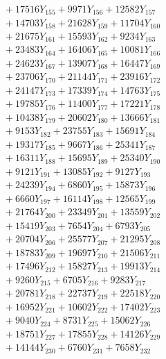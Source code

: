 \documentclass[a4paper,10pt]{article}
\begin{document}
{\begin{align}
&\;  + 17516 Y_{155} + 9971 Y_{156} + 12582 Y_{157} \\[0.3ex]
&\;  + 14703 Y_{158} + 21628 Y_{159} + 11704 Y_{160} \\[0.3ex]
&\;  + 21675 Y_{161} + 15593 Y_{162} + 9234 Y_{163} \\[0.3ex]
&\;  + 23483 Y_{164} + 16406 Y_{165} + 10081 Y_{166} \\[0.3ex]
&\;  + 24623 Y_{167} + 13907 Y_{168} + 16447 Y_{169} \\[0.3ex]
&\;  + 23706 Y_{170} + 21144 Y_{171} + 23916 Y_{172} \\[0.3ex]
&\;  + 24147 Y_{173} + 17339 Y_{174} + 14763 Y_{175} \\[0.3ex]
&\;  + 19785 Y_{176} + 11400 Y_{177} + 17221 Y_{178} \\[0.5ex]\allowbreak
&\;  + 10438 Y_{179} + 20602 Y_{180} + 13666 Y_{181} \\[0.3ex]
&\;  + 9153 Y_{182} + 23755 Y_{183} + 15691 Y_{184} \\[0.3ex]
&\;  + 19317 Y_{185} + 9667 Y_{186} + 25341 Y_{187} \\[0.3ex]
&\;  + 16311 Y_{188} + 15695 Y_{189} + 25340 Y_{190} \\[0.3ex]
&\;  + 9121 Y_{191} + 13085 Y_{192} + 9127 Y_{193} \\[0.3ex]
&\;  + 24239 Y_{194} + 6860 Y_{195} + 15873 Y_{196} \\[0.3ex]
&\;  + 6660 Y_{197} + 16114 Y_{198} + 12565 Y_{199} \\[0.3ex]
&\;  + 21764 Y_{200} + 23349 Y_{201} + 13559 Y_{202} \\[0.3ex]
&\;  + 15419 Y_{203} + 7654 Y_{204} + 6793 Y_{205} \\[0.3ex]
&\;  + 20704 Y_{206} + 25577 Y_{207} + 21295 Y_{208} \\[0.5ex]\allowbreak
&\;  + 18783 Y_{209} + 19697 Y_{210} + 21506 Y_{211} \\[0.3ex]
&\;  + 17496 Y_{212} + 15827 Y_{213} + 19913 Y_{214} \\[0.3ex]
&\;  + 9260 Y_{215} + 6705 Y_{216} + 9283 Y_{217} \\[0.3ex]
&\;  + 20781 Y_{218} + 22737 Y_{219} + 22518 Y_{220} \\[0.3ex]
&\;  + 16952 Y_{221} + 10602 Y_{222} + 17402 Y_{223} \\[0.3ex]
&\;  + 9040 Y_{224} + 8731 Y_{225} + 15062 Y_{226} \\[0.3ex]
&\;  + 18751 Y_{227} + 17855 Y_{228} + 14126 Y_{229} \\[0.3ex]
&\;  + 14144 Y_{230} + 6760 Y_{231} + 7658 Y_{232} \\[0.3ex]

\end{align}}
\end{document}
